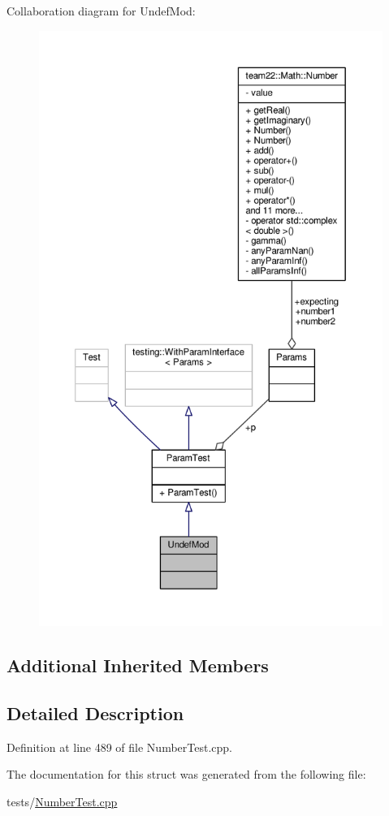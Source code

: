 Collaboration diagram for Undef\+Mod\+:
\nopagebreak
\begin{figure}[H]
\begin{center}
\leavevmode
\includegraphics[height=550pt]{struct_undef_mod__coll__graph}
\end{center}
\end{figure}
\subsection*{Additional Inherited Members}


\subsection{Detailed Description}


Definition at line 489 of file Number\+Test.\+cpp.



The documentation for this struct was generated from the following file\+:\begin{DoxyCompactItemize}
\item 
tests/\hyperlink{_number_test_8cpp}{Number\+Test.\+cpp}\end{DoxyCompactItemize}
